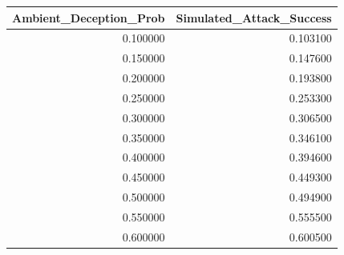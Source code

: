 \begin{tabular}{rr}
\toprule
Ambient_Deception_Prob & Simulated_Attack_Success \\
\midrule
0.100000 & 0.103100 \\
0.150000 & 0.147600 \\
0.200000 & 0.193800 \\
0.250000 & 0.253300 \\
0.300000 & 0.306500 \\
0.350000 & 0.346100 \\
0.400000 & 0.394600 \\
0.450000 & 0.449300 \\
0.500000 & 0.494900 \\
0.550000 & 0.555500 \\
0.600000 & 0.600500 \\
\bottomrule
\end{tabular}
